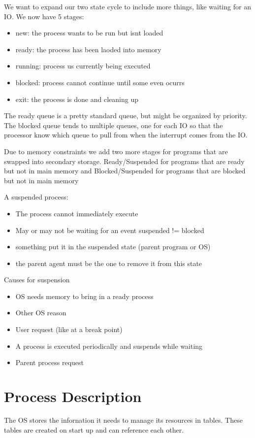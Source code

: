 \documentclass[12pt]{article}
\begin{document}
We want to expand our two state cycle to include more things, like waiting for an IO. We now have 5 stages:
\begin{itemize}
    \item new: the process wants to be run but isnt loaded
    \item ready: the process has been laoded into memory
    \item running: process us currently being executed
    \item blocked: process cannot continue until some even ocurrs
    \item exit: the process is done and cleaning up
\end{itemize}

The ready queue is a pretty standard queue, but might be organized by priority. The blocked queue tends to multiple queues, one for each IO so that the processor know which queue to pull from when the interrupt comes from the IO.

Due to memory constraints we add two more stages for programs that are swapped into secondary storage. Ready/Suspended for programs that are ready but not in main memory and Blocked/Suspended for programs that are blocked but not in main memory

A suspended process:
\begin{itemize}
    \item The process cannot immediately execute
    \item May or may not be waiting for an event suspended != blocked
    \item something put it in the suspended state (parent program or OS)
    \item the parent agent must be the one to remove it from this state
\end{itemize}

Causes for suspension
\begin{itemize}
    \item OS needs memory to bring in a ready process
    \item Other OS reason
    \item User request (like at a break point)
    \item A process is executed periodically and suspends while waiting
    \item Parent process request
\end{itemize}

\section{Process Description}
The OS stores the infornation it needs to manage its resources in tables. These tables are created on start up and can reference each other.
\end{document}

